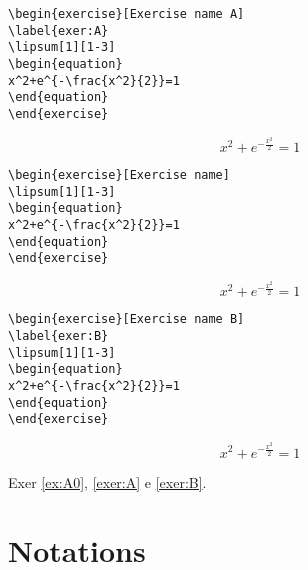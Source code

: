 \begin{verbatim}
\begin{exercise}[Exercise name A]
\label{exer:A}
\lipsum[1][1-3]
\begin{equation}
x^2+e^{-\frac{x^2}{2}}=1
\end{equation}
\end{exercise}
\end{verbatim}
\begin{exercise}
\label{exer:A}
\lipsum[1][1-3]
\begin{equation}
x^2+e^{-\frac{x^2}{2}}=1
\end{equation}
\end{exercise}

\begin{verbatim}
\begin{exercise}[Exercise name]
\lipsum[1][1-3]
\begin{equation}
x^2+e^{-\frac{x^2}{2}}=1
\end{equation}
\end{exercise}
\end{verbatim}
\begin{exercise}
\lipsum[1][1-3]
\begin{equation}
x^2+e^{-\frac{x^2}{2}}=1
\end{equation}
\end{exercise}

\begin{verbatim}
\begin{exercise}[Exercise name B]
\label{exer:B}
\lipsum[1][1-3]
\begin{equation}
x^2+e^{-\frac{x^2}{2}}=1
\end{equation}
\end{exercise}
\end{verbatim}
\begin{exercise}
\label{exer:B}
\lipsum[1][1-3]
\begin{equation}
x^2+e^{-\frac{x^2}{2}}=1
\end{equation}
\end{exercise}


Exer \ref{ex:A0}, \ref{exer:A} e \ref{exer:B}.

\section{Notations}

